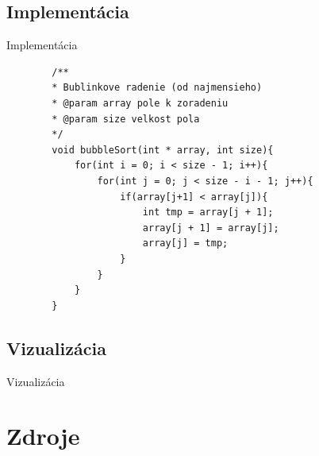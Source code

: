 \documentclass[11pt]{beamer}
\begin{document}
\subsection{Implementácia}
\begin{frame}[fragile]{Implementácia}
    \begin{lstlisting}
        /**
        * Bublinkove radenie (od najmensieho)
        * @param array pole k zoradeniu
        * @param size velkost pola
        */
        void bubbleSort(int * array, int size){
            for(int i = 0; i < size - 1; i++){
                for(int j = 0; j < size - i - 1; j++){
                    if(array[j+1] < array[j]){
                        int tmp = array[j + 1];
                        array[j + 1] = array[j];
                        array[j] = tmp;
                    }
                }
            }
        }
    \end{lstlisting}
\end{frame}

\subsection{Vizualizácia}
\begin{frame}{Vizualizácia}
    \begin{figure}[h]
    \centering
    \end{figure}
\end{frame}

\section{Zdroje}
\end{document}
